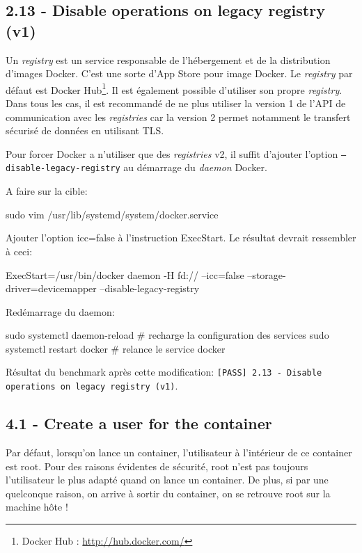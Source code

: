 \documentclass[11pt,a4paper,oneside]{report}
\newcommand{\code}[1]{\texttt{#1}}
\begin{document}
\subsection{2.13 - Disable operations on legacy registry (v1)}
Un \textit{registry} est un service responsable de l'hébergement et de la distribution d'images Docker. C'est une sorte d'App Store pour image Docker. Le \textit{registry} par défaut est Docker Hub\footnote{Docker Hub : \url{http://hub.docker.com/}}. Il est également possible d'utiliser son propre \textit{registry}. Dans tous les cas, il est recommandé de ne plus utiliser la version 1 de l'API de communication avec les \textit{registries} car la version 2 permet notamment le transfert sécurisé de données en utilisant TLS\cite{blog_docker_registry_v2}.

Pour forcer Docker a n'utiliser que des \textit{registries} v2, il suffit d'ajouter l'option \code{--disable-legacy-registry} au démarrage du \textit{daemon} Docker.

A faire sur la cible:

\begin{bashcode}
sudo vim /usr/lib/systemd/system/docker.service
\end{bashcode}

Ajouter l'option icc=false à l'instruction ExecStart. Le résultat devrait ressembler à ceci:

\begin{bashcode}
ExecStart=/usr/bin/docker daemon -H fd:// --icc=false --storage-driver=devicemapper --disable-legacy-registry
\end{bashcode}

Redémarrage du daemon:

\begin{bashcode}
sudo systemctl daemon-reload # recharge la configuration des services
sudo systemctl restart docker # relance le service docker
\end{bashcode}

Résultat du benchmark après cette modification: \code{[PASS] 2.13 - Disable operations on legacy registry (v1)}.


\subsection{4.1  - Create a user for the container}
Par défaut, lorsqu'on lance un container, l'utilisateur à l'intérieur de ce container est root. Pour des raisons évidentes de sécurité, root n'est pas toujours l'utilisateur le plus adapté quand on lance un container. De plus, si par une quelconque raison, on arrive à sortir du container, on se retrouve root sur la machine hôte !
\end{document}
